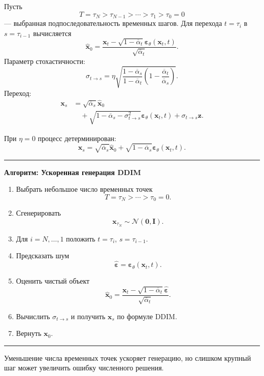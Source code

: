 \documentclass[12pt,a4paper]{article}
\theoremstyle{definition}
\newcommand{\N}{\mathcal{N}}
\newcommand{\eps}{\varepsilon}
\newcommand{\1}{\mathbf{1}}
\newenvironment{algorithmbox}[1]
{
    \begin{center}
    \begin{minipage}{0.95\textwidth}
    \hrule
    \medskip
    \textbf{Алгоритм: #1}
    \begin{enumerate}[leftmargin=*,label=\arabic*.]
}
{
    \end{enumerate}
    \medskip
    \hrule
    \end{minipage}
    \end{center}
}
\begin{document}
Пусть
\[
    T=\tau_N>\tau_{N-1}>\cdots>\tau_1>\tau_0=0
\]
--- выбранная подпоследовательность временных шагов. Для перехода
$t=\tau_i$ в $s=\tau_{i-1}$ вычисляется
\[
    \widehat{\bm{x}}_0
    =
    \frac{
        \bm{x}_t
        -
        \sqrt{1-\overline{\alpha}_t}
        \bm{\eps}_\theta(\bm{x}_t,t)
    }{
        \sqrt{\overline{\alpha}_t}
    }.
\]
Параметр стохастичности:
\[
    \sigma_{t\rightarrow s}
    =
    \eta
    \sqrt{
        \frac{1-\overline{\alpha}_s}
             {1-\overline{\alpha}_t}
        \left(
            1-\frac{\overline{\alpha}_t}
                    {\overline{\alpha}_s}
        \right)
    }.
\]
Переход:
\begin{align*}
    \bm{x}_s
    &=
    \sqrt{\overline{\alpha}_s}
    \widehat{\bm{x}}_0\\
    &\quad+
    \sqrt{
        1-\overline{\alpha}_s
        -
        \sigma_{t\rightarrow s}^2
    }
    \bm{\eps}_\theta(\bm{x}_t,t)
    +
    \sigma_{t\rightarrow s}\bm{z}.
\end{align*}

При $\eta=0$ процесс детерминирован:
\[
    \bm{x}_s
    =
    \sqrt{\overline{\alpha}_s}
    \widehat{\bm{x}}_0
    +
    \sqrt{1-\overline{\alpha}_s}
    \bm{\eps}_\theta(\bm{x}_t,t).
\]

\begin{algorithmbox}{Ускоренная генерация DDIM}
    \item Выбрать небольшое число временных точек
    \[
        T=\tau_N>\cdots>\tau_0=0.
    \]
    \item Сгенерировать
    \[
        \bm{x}_{\tau_N}\sim\N(\bm{0},\bm{I}).
    \]
    \item Для $i=N,\ldots,1$ положить
    $t=\tau_i$, $s=\tau_{i-1}$.
    \item Предсказать шум
    \[
        \widehat{\bm{\eps}}
        =
        \bm{\eps}_\theta(\bm{x}_t,t).
    \]
    \item Оценить чистый объект
    \[
        \widehat{\bm{x}}_0
        =
        \frac{
            \bm{x}_t
            -
            \sqrt{1-\overline{\alpha}_t}\widehat{\bm{\eps}}
        }{
            \sqrt{\overline{\alpha}_t}
        }.
    \]
    \item Вычислить $\sigma_{t\rightarrow s}$ и получить $\bm{x}_s$
    по формуле DDIM.
    \item Вернуть $\bm{x}_0$.
\end{algorithmbox}

Уменьшение числа временных точек ускоряет генерацию, но слишком
крупный шаг может увеличить ошибку численного решения.
\end{document}
